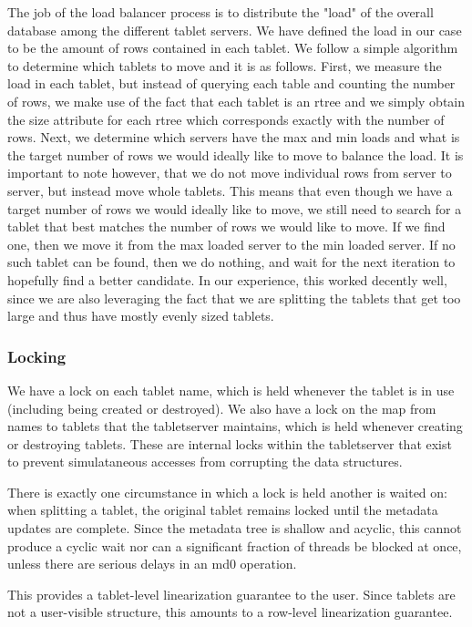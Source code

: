 \documentclass[11pt]{article}
\begin{document}
The job of the load balancer process is to distribute the "load" of the overall database among the different tablet servers. We have defined the load in our case to be the amount of rows contained in each tablet. We follow a simple algorithm to determine which tablets to move and it is as follows. First, we measure the load in each tablet, but instead of querying each table and counting the number of rows, we make use of the fact that each tablet is an rtree and we simply obtain the size attribute for each rtree which corresponds exactly with the number of rows. Next, we determine which servers have the max and min loads and what is the target number of rows we would ideally like to move to balance the load. It is important to note however, that we do not move individual rows from server to server, but instead move whole tablets. This means that even though we have a target number of rows we would ideally like to move, we still need to search for a tablet that best matches the number of rows we would like to move. If we find one, then we move it from the max loaded server to the min loaded server. If no such tablet can be found, then we do nothing, and wait for the next iteration to hopefully find a better candidate. In our experience, this worked decently well, since we are also leveraging the fact that we are splitting the tablets that get too large and thus have mostly evenly sized tablets.

\subsubsection{Locking}

We have a lock on each tablet name, which is held whenever the tablet is in use (including being created or destroyed).  We also have a lock on the map from names to tablets that the tabletserver maintains, which is held whenever creating or destroying tablets.  These are internal locks within the tabletserver that exist to prevent simulataneous accesses from corrupting the data structures.

There is exactly one circumstance in which a lock is held another is waited on: when splitting a tablet, the original tablet remains locked until the metadata updates are complete.  Since the metadata tree is shallow and acyclic, this cannot produce a cyclic wait nor can a significant fraction of threads be blocked at once, unless there are serious delays in an md0 operation.

This provides a tablet-level linearization guarantee to the user.  Since tablets are not a user-visible structure, this amounts to a row-level linearization guarantee.
\end{document}
